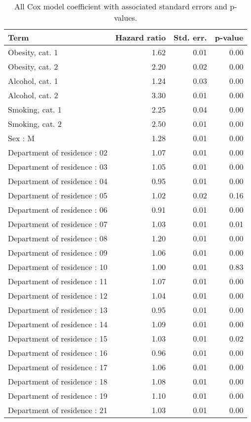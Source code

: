 \documentclass[risks,article,submit,moreauthors,pdftex]{Definitions/mdpi}
\begin{document}
\begin{longtable}{lrrr}
\caption{
\label{tab:all_cox_coefs}All Cox model coefficient with associated standard errors and p-values.
} \\ 
\toprule
Term & Hazard ratio & Std. err. & p-value \\ 
\midrule
Obesity, cat. 1 & 1.62 & 0.01 & 0.00 \\ 
Obesity, cat. 2 & 2.20 & 0.02 & 0.00 \\ 
Alcohol, cat. 1 & 1.24 & 0.03 & 0.00 \\ 
Alcohol, cat. 2 & 3.30 & 0.01 & 0.00 \\ 
Smoking, cat. 1 & 2.25 & 0.04 & 0.00 \\ 
Smoking, cat. 2 & 2.50 & 0.01 & 0.00 \\ 
Sex : M & 1.28 & 0.01 & 0.00 \\ 
Department of residence : 02 & 1.07 & 0.01 & 0.00 \\ 
Department of residence : 03 & 1.05 & 0.01 & 0.00 \\ 
Department of residence : 04 & 0.95 & 0.01 & 0.00 \\ 
Department of residence : 05 & 1.02 & 0.02 & 0.16 \\ 
Department of residence : 06 & 0.91 & 0.01 & 0.00 \\ 
Department of residence : 07 & 1.03 & 0.01 & 0.01 \\ 
Department of residence : 08 & 1.20 & 0.01 & 0.00 \\ 
Department of residence : 09 & 1.06 & 0.01 & 0.00 \\ 
Department of residence : 10 & 1.00 & 0.01 & 0.83 \\ 
Department of residence : 11 & 1.07 & 0.01 & 0.00 \\ 
Department of residence : 12 & 1.04 & 0.01 & 0.00 \\ 
Department of residence : 13 & 0.95 & 0.01 & 0.00 \\ 
Department of residence : 14 & 1.09 & 0.01 & 0.00 \\ 
Department of residence : 15 & 1.03 & 0.01 & 0.02 \\ 
Department of residence : 16 & 0.96 & 0.01 & 0.00 \\ 
Department of residence : 17 & 1.06 & 0.01 & 0.00 \\ 
Department of residence : 18 & 1.08 & 0.01 & 0.00 \\ 
Department of residence : 19 & 1.10 & 0.01 & 0.00 \\ 
Department of residence : 21 & 1.03 & 0.01 & 0.00 \\ 

\end{longtable}
\end{document}
